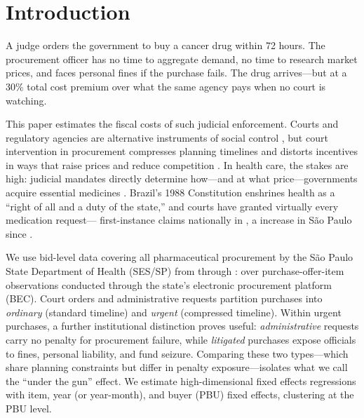 \section{Introduction}
\label{sec:introduction}

A judge orders the government to buy a cancer drug within 72 hours. The procurement officer has no time to aggregate demand, no time to research market prices, and faces personal fines if the purchase fails. The drug arrives---but at a 30\% total cost premium over what the same agency pays when no court is watching.

This paper estimates the fiscal costs of such judicial enforcement. Courts and regulatory agencies are alternative instruments of social control \citep{glaeser2003rise}, but court intervention in procurement compresses planning timelines and distorts incentives in ways that raise prices and reduce competition \citep{coviello2018court}. In health care, the stakes are high: judicial mandates directly determine how---and at what price---governments acquire essential medicines \citep{wang2015right, ferraz2009right}. Brazil's 1988 Constitution enshrines health as a ``right of all and a duty of the state,'' and courts have granted virtually every medication request---\BPlitClaimsBR{} first-instance claims nationally in \BPcnjClaimsYear, a \BPspGrowthSince{} increase in S\~ao Paulo since \BPspGrowthBaseYear{} \citep{cnj2019judicializacao}.

We use bid-level data covering all pharmaceutical procurement by the S\~ao Paulo State Department of Health (SES/SP) from \BPsampleStartYear{} through \BPsampleEndYear: over \BPnPOIfull{} purchase-offer-item observations conducted through the state's electronic procurement platform (BEC). Court orders and administrative requests partition purchases into \textit{ordinary} (standard timeline) and \textit{urgent} (compressed timeline). Within urgent purchases, a further institutional distinction proves useful: \textit{administrative} requests carry no penalty for procurement failure, while \textit{litigated} purchases expose officials to fines, personal liability, and fund seizure. Comparing these two types---which share planning constraints but differ in penalty exposure---isolates what we call the ``under the gun'' effect. We estimate high-dimensional fixed effects regressions with item, year (or year-month), and buyer (PBU) fixed effects, clustering at the PBU level.

